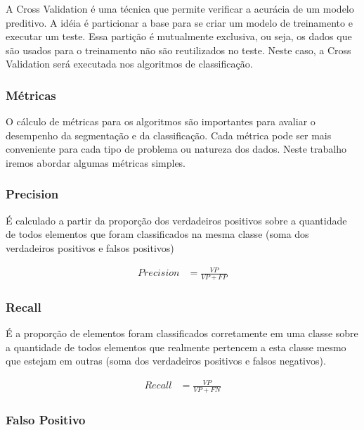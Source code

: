 A Cross Validation é uma técnica que permite verificar a acurácia de um modelo preditivo. A idéia é particionar a base para se criar um modelo de treinamento e executar um teste. Essa partição é mutualmente exclusiva, ou seja, os dados que são usados para o treinamento não são reutilizados no teste. Neste caso, a Cross Validation será executada nos algoritmos de classificação.


\subsubsection{Métricas}
O cálculo de métricas para os algoritmos são importantes para avaliar o desempenho da segmentação e da classificação. Cada métrica pode ser mais conveniente para cada tipo de problema ou natureza dos dados. Neste trabalho iremos abordar algumas métricas simples.

\subsubsection{Precision}

É calculado a partir da proporção dos verdadeiros positivos sobre a quantidade de todos elementos que foram classificados na mesma classe (soma dos verdadeiros positivos e falsos positivos)

\begin{equation}
  \label{eq:precision}
  \begin{aligned}
Precision &= \frac{VP}{VP + FP} 
  \end{aligned}  
\end{equation}

\subsubsection{Recall}

É a proporção de elementos foram classificados corretamente em uma classe 
sobre a quantidade de todos elementos que realmente pertencem a esta classe mesmo que estejam em outras (soma dos verdadeiros positivos e falsos negativos). 

\begin{equation}
  \label{eq:precision}
  \begin{aligned}
Recall &= \frac{VP}{VP + FN} 
  \end{aligned}  
\end{equation}

\subsubsection{Falso Positivo}
\lipsum[27]

